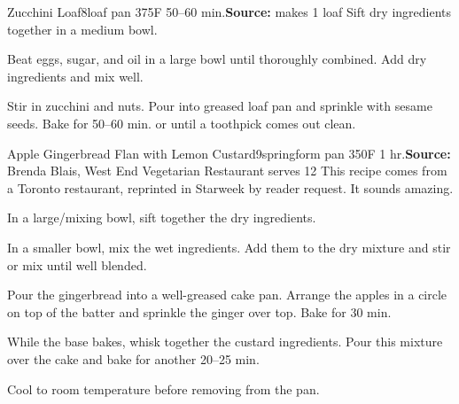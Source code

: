 \begin{recipe}{Zucchini Loaf}{8\inch{}\inch loaf pan \hfill 375\0F \hfill 50--60 min.}{\textbf{Source:} \hfill makes 1 loaf}
 Sift dry ingredients together in a medium bowl.

 Beat eggs, sugar, and oil in a large bowl until thoroughly combined. Add dry ingredients and mix well.

 Stir in zucchini and nuts. Pour into greased loaf pan and sprinkle with sesame seeds. Bake for 50--60 min. or until a toothpick comes out clean.
\end{recipe}

\begin{recipe}{Apple Gingerbread Flan with Lemon Custard}{9\inch springform pan \hfill 350\0F \hfill 1 hr.}{\textbf{Source:} Brenda Blais, West End Vegetarian Restaurant \hfill serves 12}
 \freeform [CB] This recipe comes from a Toronto restaurant, reprinted in Starweek by reader request. It sounds amazing.

 In a large/mixing bowl, sift together the dry ingredients.

 In a smaller bowl, mix the wet ingredients. Add them to the dry mixture and stir or mix until well blended.

 Pour the gingerbread into a well-greased cake pan. Arrange the apples in a circle on top of the batter and sprinkle the ginger over top. Bake for 30 min.

 While the base bakes, whisk together the custard ingredients. Pour this mixture over the cake and bake for another 20--25 min.

 \newstep Cool to room temperature before removing from the pan.
\end{recipe}
